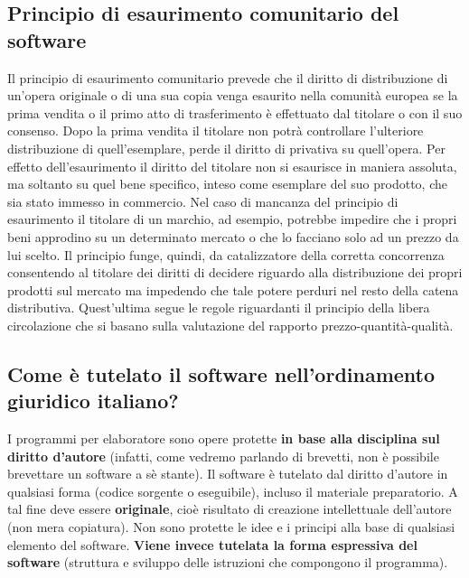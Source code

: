 \subsection{Principio di esaurimento comunitario del software}
Il principio di esaurimento comunitario prevede che il diritto di distribuzione di un'opera originale o di una sua copia venga esaurito nella comunità europea se la prima vendita o il primo atto di trasferimento è effettuato dal titolare o con il suo consenso.
\newline
Dopo la prima vendita il titolare non potrà controllare l'ulteriore distribuzione di quell'esemplare, perde il diritto di privativa su quell'opera.
Per effetto dell'esaurimento il diritto del titolare non si esaurisce in maniera assoluta, ma soltanto su quel bene specifico, inteso come esemplare del suo prodotto, che sia stato immesso in commercio.
\newline
Nel caso di mancanza del principio di esaurimento il titolare di un marchio, ad esempio, potrebbe impedire che i propri beni approdino su un determinato mercato o che lo facciano solo ad un prezzo da lui scelto. Il principio funge, quindi, da catalizzatore della corretta concorrenza consentendo al titolare dei diritti di decidere riguardo alla distribuzione dei propri prodotti sul mercato ma impedendo che tale potere perduri nel resto della catena distributiva. Quest'ultima segue le regole riguardanti il principio della libera circolazione che si basano sulla valutazione del rapporto prezzo-quantità-qualità.


\subsection{Come è tutelato il software nell'ordinamento giuridico italiano?}
I programmi per elaboratore sono opere protette \textbf{in base alla disciplina sul diritto d'autore} (infatti, come vedremo parlando
di brevetti, non è possibile brevettare un software a sè stante).\newline
Il software è tutelato dal diritto d'autore in qualsiasi forma (codice sorgente o eseguibile), incluso il materiale
preparatorio. A tal fine deve essere \textbf{originale}, cioè risultato di creazione intellettuale
dell'autore (non mera copiatura).\newline
Non sono protette le idee e i principi alla base di qualsiasi elemento del software. \newline
\textbf{Viene invece tutelata la forma espressiva del software} (struttura e sviluppo delle istruzioni che compongono il programma).

